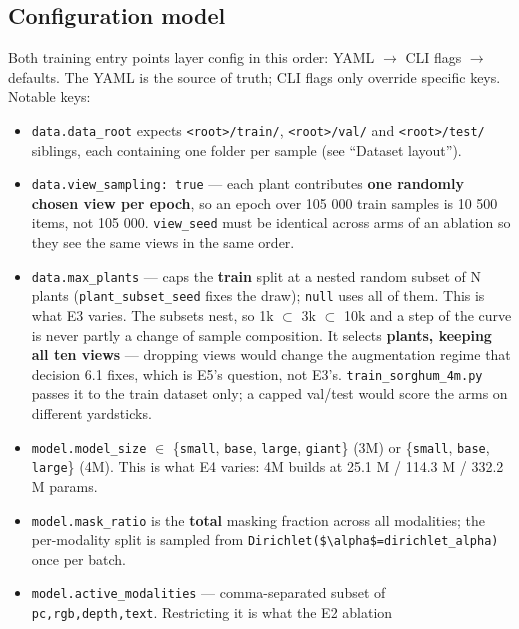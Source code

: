 \documentclass[
  10pt,
]{article}
\providecommand{\tightlist}{%
  \setlength{\itemsep}{0pt}\setlength{\parskip}{0pt}}
\begin{document}
\subsection{Configuration model}\label{configuration-model}

Both training entry points layer config in this order: YAML \(\to\) CLI
flags \(\to\) defaults. The YAML is the source of truth; CLI flags only
override specific keys. Notable keys:

\begin{itemize}
\tightlist
\item
  \texttt{data.data\_root} expects
  \texttt{\textless{}root\textgreater{}/train/},
  \texttt{\textless{}root\textgreater{}/val/} and
  \texttt{\textless{}root\textgreater{}/test/} siblings, each containing
  one folder per sample (see ``Dataset layout'').
\item
  \texttt{data.view\_sampling:\ true} --- each plant contributes
  \textbf{one randomly chosen view per epoch}, so an epoch over 105 000
  train samples is 10 500 items, not 105 000. \texttt{view\_seed} must
  be identical across arms of an ablation so they see the same views in
  the same order.
\item
  \texttt{data.max\_plants} --- caps the \textbf{train} split at a
  nested random subset of N plants (\texttt{plant\_subset\_seed} fixes
  the draw); \texttt{null} uses all of them. This is what E3 varies. The
  subsets nest, so 1k \(\subset\) 3k \(\subset\) 10k and a step of the
  curve is never partly a change of sample composition. It selects
  \textbf{plants, keeping all ten views} --- dropping views would change
  the augmentation regime that decision 6.1 fixes, which is E5's
  question, not E3's. \texttt{train\_sorghum\_4m.py} passes it to the
  train dataset only; a capped val/test would score the arms on
  different yardsticks.
\item
  \texttt{model.model\_size} \(\in\) \{\texttt{small}, \texttt{base},
  \texttt{large}, \texttt{giant}\} (3M) or \{\texttt{small},
  \texttt{base}, \texttt{large}\} (4M). This is what E4 varies: 4M
  builds at 25.1 M / 114.3 M / 332.2 M params.
\item
  \texttt{model.mask\_ratio} is the \textbf{total} masking fraction
  across all modalities; the per-modality split is sampled from
  \texttt{Dirichlet(\$\textbackslash{}alpha\$=dirichlet\_alpha)} once
  per batch.
\item
  \texttt{model.active\_modalities} --- comma-separated subset of
  \texttt{pc,rgb,depth,text}. Restricting it is what the E2 ablation

\end{itemize}
\end{document}
